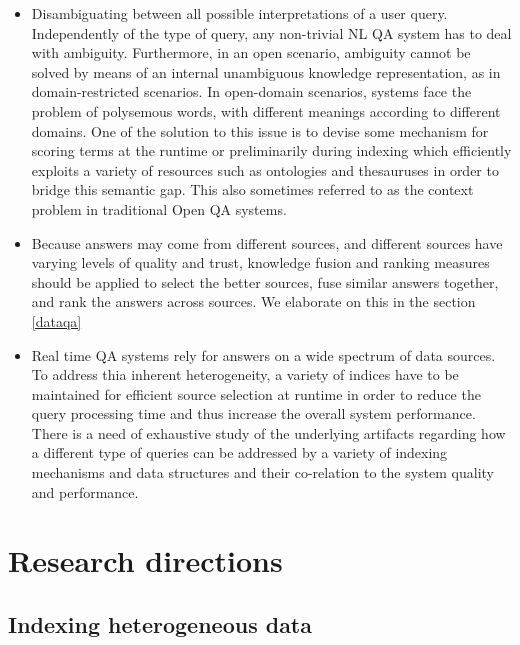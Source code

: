 \documentclass{article}
\begin{document}
\begin{itemize}

\item Disambiguating between all possible interpretations of a user query. Independently of the type of query, any non-trivial NL QA system has to deal with ambiguity. Furthermore, in an open scenario, ambiguity cannot be solved by means of an internal unambiguous knowledge representation, as in domain-restricted scenarios. In open-domain scenarios, systems face the problem of polysemous words, with different meanings according to different domains. One of the solution to this issue is to devise some mechanism for scoring terms at the runtime or preliminarily during indexing which efficiently exploits a variety of resources such as ontologies and thesauruses in order to bridge this semantic gap.  This also sometimes referred to as the context problem in traditional Open QA systems. 

\item Because answers may come from different sources, and different sources have varying levels of quality and trust, knowledge fusion and ranking measures should be applied to select the better sources, fuse similar answers together, and rank the answers across sources. We elaborate on this in the section \ref{dataqa}

\item Real time QA systems rely for answers on a wide spectrum  of data sources. To address thia inherent heterogeneity, a variety of indices have to be maintained for efficient source selection at runtime in order to reduce the query processing time and thus increase the overall system performance. There is a need of exhaustive study of the underlying artifacts regarding how a different type of queries can be addressed by a variety of indexing mechanisms and data structures and their co-relation to the system quality and performance. 
\end{itemize}





\section{Research directions}
\label{research}

\subsection{Indexing heterogeneous data}
\end{document}
